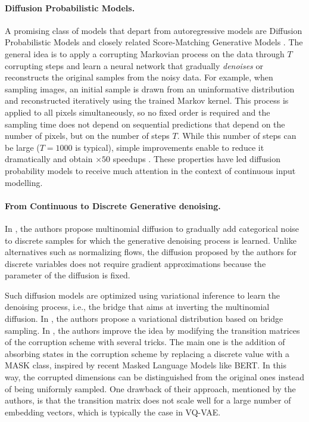 \documentclass{article}
\theoremstyle{plain}
\theoremstyle{definition}
\theoremstyle{remark}
\begin{document}
\paragraph{Diffusion Probabilistic Models.}
A promising class of models that depart from autoregressive models are Diffusion Probabilistic Models \cite{sohldickstein2015deep, ho2020denoising} and closely related Score-Matching Generative Models \cite{song2019generative, de2021simulating}. The general idea is to apply a corrupting Markovian process on the data through $T$ corrupting steps and learn a neural network that gradually \textit{denoises} or reconstructs the original samples from the noisy data.
For example, when sampling images, an initial sample is drawn from an uninformative distribution and reconstructed iteratively using the trained Markov kernel. This process is applied to all pixels simultaneously, so no fixed order is required and the sampling time does not depend on sequential predictions that depend on the number of pixels, but on the number of steps $T$. While this number of steps can be large ($T=1000$ is typical), simple improvements enable to reduce it dramatically and obtain $\times 50$ speedups \cite{song2021denoising}. These properties have led diffusion probability models to receive much attention in the context of continuous input modelling.


\paragraph{From Continuous to Discrete Generative denoising.}
In \cite{hoogeboom2021argmax}, the authors propose multinomial diffusion to gradually add categorical noise to discrete samples for which the generative denoising process is learned. Unlike alternatives such as normalizing flows, the diffusion proposed by the authors for discrete variables does not require gradient approximations because the parameter of the diffusion is fixed.

Such diffusion models are optimized using variational inference to learn the denoising process, i.e., the bridge that aims at inverting the multinomial diffusion. In \cite{hoogeboom2021argmax}, the authors propose a variational distribution based on bridge sampling.  
In \cite{austin2021structured}, the authors improve the idea by modifying the transition matrices of the corruption scheme with several tricks. The main one is the addition of absorbing states in the corruption scheme by replacing a discrete value with a MASK class, inspired by recent Masked Language Models like BERT. In this way, the corrupted dimensions can be distinguished from the original ones instead of being uniformly sampled. 
One drawback of their approach, mentioned by the authors, is that the transition matrix does not scale well for a large number of embedding vectors, which is typically the case in VQ-VAE.
\end{document}
